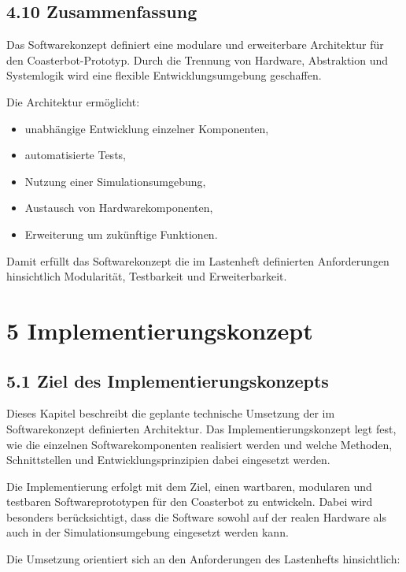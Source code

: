 \documentclass[
  a4paper,
  12pt,
  DIV=12,        %
  parskip=half,  %
  headings=small %
]{scrartcl}
\theoremstyle{definition}
\providecommand{\tightlist}{%
  \setlength{\itemsep}{0pt}\setlength{\parskip}{0pt}}
\theoremstyle{definition}
\providecommand{\tightlist}{%
  \setlength{\itemsep}{0pt}\setlength{\parskip}{0pt}}
\begin{document}
\subsection{4.10 Zusammenfassung}\label{zusammenfassung-2}

Das Softwarekonzept definiert eine modulare und erweiterbare Architektur
für den Coasterbot-Prototyp. Durch die Trennung von Hardware,
Abstraktion und Systemlogik wird eine flexible Entwicklungsumgebung
geschaffen.

Die Architektur ermöglicht:

\begin{itemize}
\tightlist
\item
  unabhängige Entwicklung einzelner Komponenten,
\item
  automatisierte Tests,
\item
  Nutzung einer Simulationsumgebung,
\item
  Austausch von Hardwarekomponenten,
\item
  Erweiterung um zukünftige Funktionen.
\end{itemize}

Damit erfüllt das Softwarekonzept die im Lastenheft definierten
Anforderungen hinsichtlich Modularität, Testbarkeit und Erweiterbarkeit.

\section{5 Implementierungskonzept}\label{implementierungskonzept}

\subsection{5.1 Ziel des
Implementierungskonzepts}\label{ziel-des-implementierungskonzepts}

Dieses Kapitel beschreibt die geplante technische Umsetzung der im
Softwarekonzept definierten Architektur. Das Implementierungskonzept
legt fest, wie die einzelnen Softwarekomponenten realisiert werden und
welche Methoden, Schnittstellen und Entwicklungsprinzipien dabei
eingesetzt werden.

Die Implementierung erfolgt mit dem Ziel, einen wartbaren, modularen und
testbaren Softwareprototypen für den Coasterbot zu entwickeln. Dabei
wird besonders berücksichtigt, dass die Software sowohl auf der realen
Hardware als auch in der Simulationsumgebung eingesetzt werden kann.

Die Umsetzung orientiert sich an den Anforderungen des Lastenhefts
hinsichtlich:
\end{document}
